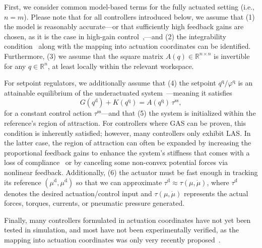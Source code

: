 First, we consider common model-based terms for the fully actuated setting (i.e., $n = m$). Please note that for all controllers introduced below, we assume that (1) the model is reasonably accurate—or that sufficiently high feedback gains are chosen, as it is the case in high-gain control~\citep{marino1985high},—and (2) the integrability condition~\citep{pustina2024input} along with the mapping into actuation coordinates can be identified. Furthermore, (3) we assume that the square matrix $A(q) \in \mathbb{R}^{n \times n}$ is invertible for any $q \in \mathbb{R}^n$, at least locally within the relevant workspace.

For setpoint regulators, we additionally assume that (4) the setpoint $q^\mathrm{q}/\varphi^\mathrm{q}$ is an attainable equilibrium of the underactuated system~\citep{pustina2022feedback}—meaning it satisfies
\begin{equation}
    G(q^\mathrm{d}) + K(q^\mathrm{q}) = A(q^\mathrm{q}) \, \tau^\mathrm{ss},
\end{equation}
for a constant control action $\tau^\mathrm{ss}$—and that (5) the system is initialized within the reference’s region of attraction. For controllers where \gls{GAS} can be proven, this condition is inherently satisfied; however, many controllers only exhibit \gls{LAS}. In the latter case, the region of attraction can often be expanded by increasing the proportional feedback gains to enhance the system’s stiffness that comes with a loss of compliance~\citep{della2017controlling, della2023model} or by canceling some non-convex potential forces via nonlinear feedback. Additionally, (6) the actuator must be fast enough in tracking its reference $(\mu^\mathrm{d}, \mu^\mathrm{d})$ so that we can approximate $\tau^\mathrm{d} \approx \tau(\mu,\dot{\mu})$, where $\tau^\mathrm{d}$ denotes the desired actuation/control input and $\tau(\mu,\dot{\mu})$ represents the actual forces, torques, currents, or pneumatic pressure generated.

Finally, many controllers formulated in actuation coordinates have not yet been tested in simulation, and most have not been experimentally verified, as the mapping into actuation coordinates was only very recently proposed~\citep{pustina2024input}.

